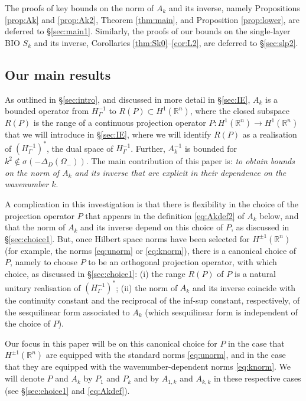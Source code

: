 \documentclass{birkjour}
\theoremstyle{definition}
\theoremstyle{remark}
\numberwithin{equation}{section}
\newcommand{\R}{\mathbb{R}}
\begin{document}
The proofs of key bounds on the norm of $A_k$ and its inverse,  namely Propositions \ref{prop:Ak} and \ref{prop:Ak2}, Theorem \ref{thm:main}, and Proposition \ref{prop:lower}, are deferred to \S\ref{sec:main1}. Similarly, the proofs of our bounds on the single-layer BIO $S_k$ and its inverse, Corollaries \ref{thm:Sk0}--\ref{cor:L2}, are deferred to \S\ref{sec:slp2}.

\subsection{Our main results} \label{sec:main}

As outlined in \S\ref{sec:intro}, and discussed in more detail in \S\ref{sec:IE}, $A_k$ is a bounded operator from $H^{-1}_\Gamma$ to $R(P)\subset H^1(\R^n)$, where the closed subspace $R(P)$ is the range of a continuous projection operator $P:H^1(\R^n)\to H^1(\R^n)$ that we will introduce in \S\ref{sec:IE}, where we will identify $R(P)$ as a realisation of $(H_\Gamma^{-1})^*$, the dual space of $H_\Gamma^{-1}$. Further, $A_k^{-1}$ is bounded for $k^2\not\in \sigma(-\Delta_D(\Omega_-))$. The main contribution of this paper is: {\em to obtain bounds on the norm of  $A_k$ and its inverse that are explicit in their dependence on the wavenumber $k$}.  

A complication in this investigation is that there is flexibility in the choice of the projection operator $P$ that appears in the definition \eqref{eq:Akdef2} of $A_k$ below, and that the norm of $A_k$ and its inverse depend on this choice of $P$, as discussed in \S\ref{sec:choice1}. But, once Hilbert space norms have been selected for $H^{\pm 1}(\R^n)$ (for example, the norms \eqref{eq:unorm} or \eqref{eq:knorm}), there is a canonical choice of $P$, namely to choose $P$ to be an orthogonal projection operator, with which choice, as discussed in \S\ref{sec:choice1}: (i) the range $R(P)$ of $P$ is a natural unitary realisation of $(H_\Gamma^{-1})^*$; (ii) the norm of $A_k$ and its inverse coincide with the continuity constant and the reciprocal of the inf-sup constant, respectively, of the sesquilinear form associated to $A_k$ (which sesquilinear form is independent of the choice of $P$). 

Our focus in this paper will be on this canonical choice for $P$ in the case that $H^{\pm 1}(\R^n)$ are equipped with the standard norms \eqref{eq:unorm}, and in the case that they are equipped with the wavenumber-dependent norms \eqref{eq:knorm}. We will denote $P$ and $A_k$ by $P_1$ and $P_k$ and by $A_{1,k}$ and $A_{k,k}$ in these respective cases (see \S\ref{sec:choice1} and \eqref{eq:Akdef}). 
\end{document}
